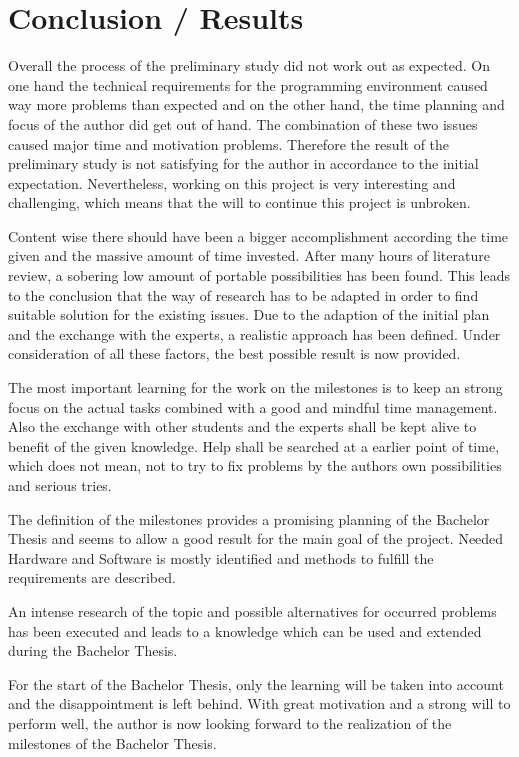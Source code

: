 \chapter{Conclusion / Results}
\label{chap:conclusions}
Overall the process of the preliminary study did not work out as expected. On one hand the technical requirements for the programming environment caused way more problems than expected and on the other hand, the time planning and focus of the author did get out of hand. The combination of these two issues caused major time and motivation problems. Therefore the result of the preliminary study is not satisfying for the author in accordance to the initial expectation.
Nevertheless, working on this project is very interesting and challenging, which means that the will to continue this project is unbroken.

Content wise there should have been a bigger accomplishment according the time given and the massive amount of time invested. After many hours of literature review, a sobering low amount of portable possibilities has been found. This leads to the conclusion that the way of research has to be adapted in order to find suitable solution for the existing issues.
Due to the adaption of the initial plan and the exchange with the experts, a realistic approach has been defined. Under consideration of all these factors, the best possible result is now provided.

The most important learning for the work on the milestones is to keep an strong focus on the actual tasks combined with a good and mindful time management. Also the exchange with other students and the experts shall be kept alive to benefit of the given knowledge. Help shall be searched at a earlier point of time, which does not mean, not to try to fix problems by the authors own possibilities and serious tries.

The definition of the milestones provides a promising planning of the Bachelor Thesis and seems to allow a good result for the main goal of the project. Needed Hardware and Software is mostly identified and methods to fulfill the requirements are described. 

An intense research of the topic and possible alternatives for occurred problems has been executed and leads to a knowledge which can be used and extended during the Bachelor Thesis.  

For the start of the Bachelor Thesis, only the learning will be taken into account and the disappointment is left behind. With great motivation and a strong will to perform well, the author is now looking forward to the realization of the milestones of the Bachelor Thesis. 